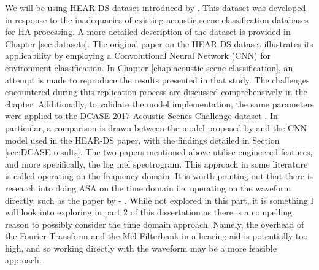 \documentclass[logo,bsc,singlespacing,parskip,online]{infthesis}
\begin{document}
We will be using HEAR-DS dataset introduced by \citet{Huwel2020HearDS}. This dataset was developed in response to the inadequacies of existing acoustic scene classification databases for HA processing. A more detailed description of the dataset is provided in Chapter \ref{sec:datasets}.
The original paper on the HEAR-DS dataset illustrates its applicability by employing a Convolutional Neural Network (CNN) for environment classification. In Chapter \ref{chap:acoustic-scene-classification}, an attempt is made to reproduce the results presented in that study. The challenges encountered during this replication process are discussed comprehensively in the chapter. Additionally, to validate the model implementation, the same parameters were applied to the DCASE 2017 Acoustic Scenes Challenge dataset \cite{DCASE2017challenge}. In particular, a comparison is drawn between the model proposed by \citet{schindler_multi-temporal_2018} and the CNN model used in the HEAR-DS paper, with the findings detailed in Section \ref{sec:DCASE-results}.
The two papers mentioned above utilise engineered features, and more specifically, the log mel spectrogram. This 
approach in some literature is called operating on the frequency domain. It is worth pointing out 
that there is research into doing ASA on the time domain i.e. operating on the waveform directly, 
such as the paper by \cite{dai_very_2016} - \cite{kumar_end_2020}. While not explored in this part, 
it is something I will look into exploring in part 2 of this dissertation as there is 
a compelling reason to possibly consider the time domain approach. Namely, 
the overhead of the Fourier Transform and the Mel Filterbank in a hearing aid 
is potentially too high, and so working directly with the waveform may be a more feasible approach.

\end{document}
